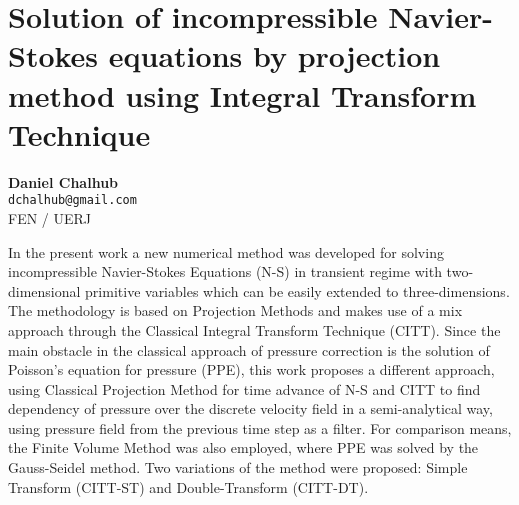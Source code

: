 
\section{Solution of incompressible Navier-Stokes equations by projection method using Integral Transform Technique}

\textbf{Daniel Chalhub}\\
\texttt{\small{dchalhub@gmail.com}}\\
FEN / UERJ

In the present work a new numerical method was developed for solving incompressible Navier-Stokes Equations (N-S) in transient regime with two-dimensional primitive variables which can be easily extended to three-dimensions. The methodology is based on Projection Methods and makes use of a mix approach through the Classical Integral Transform Technique (CITT). Since the main obstacle in the classical approach of pressure correction is the solution of Poisson's equation for pressure (PPE), this work proposes a different approach, using Classical Projection Method for time advance of N-S and CITT to find dependency of pressure over the discrete velocity field in a semi-analytical way, using pressure field from the previous time step as a filter. For comparison means, the Finite Volume Method was also employed, where PPE was solved by the Gauss-Seidel method. Two variations of the method were proposed: Simple Transform (CITT-ST) and Double-Transform (CITT-DT).


